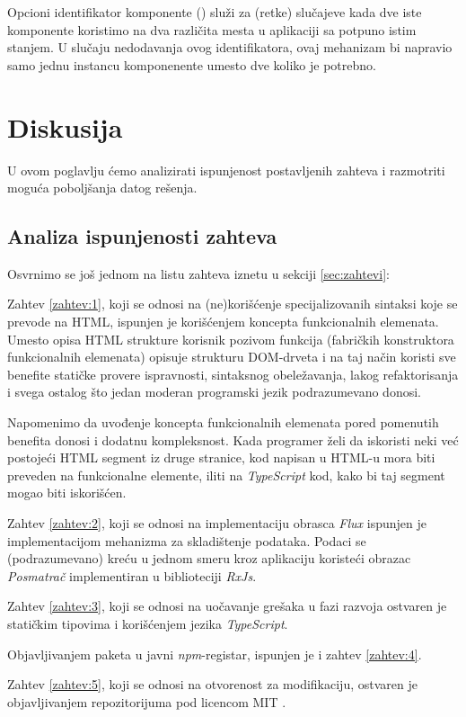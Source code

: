 \documentclass[12pt,oneside]{memoir}
\newcommand{\code}[1]{\allowbreak{\colorbox{codegray}{\texttt{\scalebox{0.9}{#1}}}}}%
\begin{document}
Opcioni identifikator komponente (\code{id}) služi za (retke) slučajeve kada dve iste komponente koristimo
na dva različita mesta u aplikaciji sa potpuno istim stanjem. U slučaju nedodavanja ovog identifikatora, ovaj mehanizam bi napravio samo jednu instancu komponenente umesto dve koliko je potrebno.
\chapter{Diskusija}\label{chap:diskusija}
U ovom poglavlju ćemo analizirati ispunjenost postavljenih zahteva i razmotriti moguća poboljšanja datog rešenja.
\section{Analiza ispunjenosti zahteva}
\noindent Osvrnimo se još jednom na listu zahteva iznetu u sekciji \ref{sec:zahtevi}:

Zahtev \ref{zahtev:1}, koji se odnosi na (ne)korišćenje
specijalizovanih sintaksi koje se prevode na HTML, ispunjen je
korišćenjem koncepta funkcionalnih elemenata. Umesto opisa HTML
strukture korisnik pozivom funkcija (fabričkih konstruktora
funkcionalnih elemenata) opisuje strukturu DOM-drveta i na taj način
koristi sve benefite statičke provere ispravnosti, sintaksnog
obeležavanja, lakog refaktorisanja i svega ostalog što jedan moderan
programski jezik podrazumevano donosi.

Napomenimo da uvođenje koncepta funkcionalnih elemenata pored pomenutih
benefita donosi i dodatnu kompleksnost. Kada programer
želi da iskoristi neki već postojeći HTML segment iz druge stranice,
kod napisan u HTML-u mora biti preveden
na funkcionalne elemente, iliti na \emph{TypeScript} kod,
kako bi taj segment mogao biti iskorišćen.

Zahtev \ref{zahtev:2}, koji se odnosi na implementaciju obrasca
\emph{Flux} ispunjen je implementacijom \code{Store<Model>}
mehanizma za skladištenje podataka. Podaci se (podrazumevano) kreću
u jednom smeru kroz aplikaciju koristeći obrazac \emph{Posmatrač}
implementiran u biblioteciji \emph{RxJs}.

Zahtev \ref{zahtev:3}, koji se odnosi na uočavanje grešaka u fazi razvoja ostvaren je statičkim tipovima i korišćenjem jezika \emph{TypeScript}.

Objavljivanjem paketa u javni \emph{npm}-registar, ispunjen je i zahtev \ref{zahtev:4}.

Zahtev \ref{zahtev:5}, koji se odnosi na otvorenost za modifikaciju,
ostvaren je objavljivanjem repozitorijuma pod licencom MIT \cite{MIT}.
\end{document}
